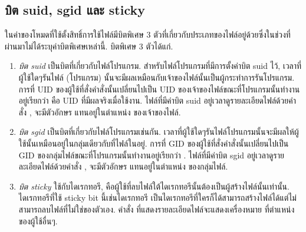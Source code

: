 \begin{thwbr}
\section{บิต suid, sgid และ sticky}\label{sec:suid}
ในค่าของโหมดที่ใช้ตั้งสิทธิ์การใช้ไฟล์มีบิตพิเศษ 3 ตัวที่เกี่ยวกับประเภทของไฟล์อยู่ด้วยซึ่งในช่วงที่ผ่านมาไม่ได้ระบุค่าบิตพิเศษเหล่านี้. บิตพิเศษ 3 ตัวได้แก่.
\begin{enumerate}
\item \emph{บิต suid} เป็นบิตที่เกี่ยวกับไฟล์โปรแกรม. สำหรับไฟล์โปรแกรมที่มีการตั้งค่าบิต suid ไว้, เวลาที่ผู้ใช้ใดๆรันไฟล์ (โปรแกรม) นั้นจะมีผลเหมือนกับเจ้าของไฟล์นั้นเป็นผู้กระทำการรันโปรแกรม. การที่ UID ของผู้ใช้ที่สั่งคำสั่งนั้นเปลี่ยนไปเป็น UID ของเจ้าของไฟล์ขณะที่โปรแกรมนั้นทำงานอยู่เรียกว่า  คือ UID ที่มีผลจริงเมื่อใช้งาน. ไฟล์ที่มีค่าบิต suid อยู่เวลาดูรายละเอียดไฟล์ด้วยคำสั่ง , จะมีตัวอักษร  แทนอยู่ในตำแหน่ง  ของเจ้าของไฟล์.
\item \emph{บิต sgid} เป็นบิตที่เกี่ยวกับไฟล์โปรแกรมเช่นกัน. เวลาที่ผู้ใช้ใดๆรันไฟล์โปรแกรมนั้นจะมีผลให้ผู้ใช้นั้นเหมือนอยู่ในกลุ่มเดียวกับที่ไฟล์ในอยู่. การที่ GID ของผู้ใช้ที่สั่งคำสั่งนั้นเปลี่ยนไปเป็น GID ของกลุ่มไฟล์ขณะที่โปรแกรมนั้นทำงานอยู่เรียกว่า . ไฟล์ที่มีค่าบิต sgid อยู่เวลาดูรายละเอียดไฟล์ด้วยคำสั่ง , จะมีตัวอักษร  แทนอยู่ในตำแหน่ง  ของกลุ่มไฟล์. 
\item \emph{บิต sticky} ใช้กับไดเรกทอรี, คือผู้ใช้ที่ลบไฟล์ใต้ไดเรกทอรีนั้นต้องเป็นผู้สร้างไฟล์นั้นเท่านั้น. ไดเรกทอรีที่ใช้ sticky bit นี้เช่นไดเรกทอรี  เป็นไดเรกทอรีที่ใครก็ได้สามารถสร้างไฟล์ได้แต่ไม่สามารถลบไฟล์ที่ไม่ใช่ของตัวเอง. คำสั่ง  ที่แสดงรายละเอียดไฟล์จะแสดงเครื่องหมาย  ที่ตำแหน่ง  ของผู้ใช้อื่นๆ.
\end{enumerate}
\begin{MyExample}
\end{MyExample}%


\end{thwbr}
